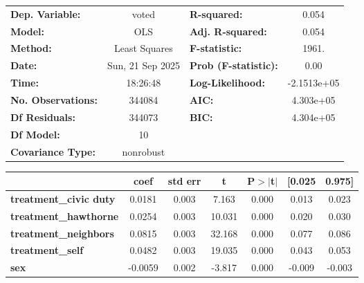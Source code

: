 \begin{center}
\begin{tabular}{lclc}
\toprule
\textbf{Dep. Variable:}        &      voted       & \textbf{  R-squared:         } &      0.054   \\
\textbf{Model:}                &       OLS        & \textbf{  Adj. R-squared:    } &      0.054   \\
\textbf{Method:}               &  Least Squares   & \textbf{  F-statistic:       } &      1961.   \\
\textbf{Date:}                 & Sun, 21 Sep 2025 & \textbf{  Prob (F-statistic):} &      0.00    \\
\textbf{Time:}                 &     18:26:48     & \textbf{  Log-Likelihood:    } & -2.1513e+05  \\
\textbf{No. Observations:}     &      344084      & \textbf{  AIC:               } &  4.303e+05   \\
\textbf{Df Residuals:}         &      344073      & \textbf{  BIC:               } &  4.304e+05   \\
\textbf{Df Model:}             &          10      & \textbf{                     } &              \\
\textbf{Covariance Type:}      &    nonrobust     & \textbf{                     } &              \\
\bottomrule
\end{tabular}
\begin{tabular}{lcccccc}
                               & \textbf{coef} & \textbf{std err} & \textbf{t} & \textbf{P$> |$t$|$} & \textbf{[0.025} & \textbf{0.975]}  \\
\midrule
\textbf{treatment\_civic duty} &       0.0181  &        0.003     &     7.163  &         0.000        &        0.013    &        0.023     \\
\textbf{treatment\_hawthorne}  &       0.0254  &        0.003     &    10.031  &         0.000        &        0.020    &        0.030     \\
\textbf{treatment\_neighbors}  &       0.0815  &        0.003     &    32.168  &         0.000        &        0.077    &        0.086     \\
\textbf{treatment\_self}       &       0.0482  &        0.003     &    19.035  &         0.000        &        0.043    &        0.053     \\
\textbf{sex}                   &      -0.0059  &        0.002     &    -3.817  &         0.000        &       -0.009    &       -0.003     \\

\end{tabular}
\end{center}
